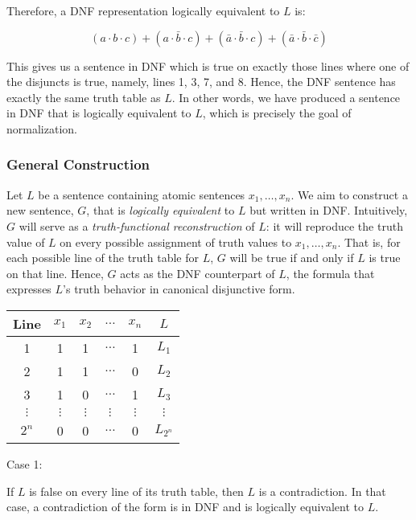\documentclass[12pt,a4paper,openany]{article}
\begin{document}
Therefore, a DNF representation logically equivalent to $L$ is:

$$(a \cdot b \cdot c) + (a \cdot \bar b \cdot c) + (\bar a \cdot \bar b \cdot c) + (\bar a \cdot \bar b \cdot \bar c)$$

This gives us a sentence in DNF which is true on exactly those lines
where one of the disjuncts is true, namely, lines 1, 3, 7, and 8. Hence,
the DNF sentence has exactly the same truth table as $L$. In other
words, we have produced a sentence in DNF that is logically equivalent
to $L$, which is precisely the goal of normalization.

\subsubsection{General Construction}

Let $L$ be a sentence containing atomic sentences $x_1, \dots, x_n$.
We aim to construct a new sentence, $G$, that is \emph{logically
equivalent} to $L$ but written in DNF. Intuitively, $G$ will serve
as a \emph{truth-functional reconstruction} of $L$: it will reproduce
the truth value of $L$ on every possible assignment of truth values to
$x_1, \dots, x_n$. That is, for each possible line of the truth table
for $L$, $G$ will be true if and only if $L$ is true on that line.
Hence, $G$ acts as the DNF counterpart of $L$, the formula that
expresses $L$'s truth behavior in canonical disjunctive form.

\begin{center}
\begin{tabular}{|c|c|c|c|c|c|}
\hline
Line & $x_1$ & $x_2$ & $\dots$ & $x_n$ & $L$ \\
\hline
1 & 1 & 1 & $\dots$ & 1 & $L_1$ \\
\hline
2 & 1 & 1 & $\dots$ & 0 & $L_2$ \\
\hline
3 & 1 & 0 & $\dots$ & 1 & $L_3$ \\
\hline
$\vdots$ & $\vdots$ & $\vdots$ & $\vdots$ & $\vdots$ & $\vdots$ \\
\hline
$2^n$ & 0 & 0 & $\dots$ & 0 & $L_{2^n}$ \\
\hline
\end{tabular}
\end{center}

Case 1:

If $L$ is false on every line of its truth table, then $L$ is a
contradiction. In that case, a contradiction of the form is in DNF and
is logically equivalent to $L$.
\end{document}
